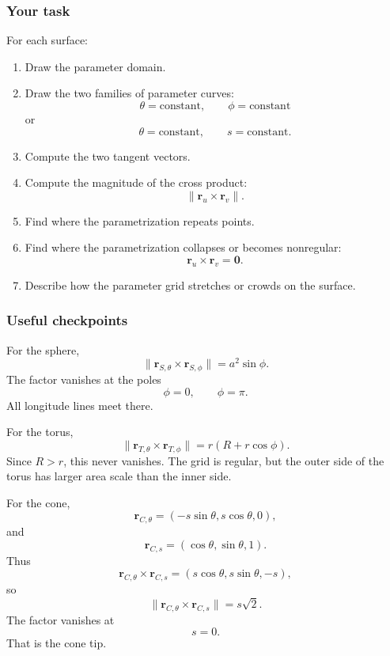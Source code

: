 \subsubsection*{Your task}

For each surface:

\begin{enumerate}
\item Draw the parameter domain.

\item Draw the two families of parameter curves:
\[
    \theta=\text{constant},
    \qquad
    \phi=\text{constant}
\]
or
\[
    \theta=\text{constant},
    \qquad
    s=\text{constant}.
\]

\item Compute the two tangent vectors.

\item Compute the magnitude of the cross product:
\[
    \|\mathbf r_u\times\mathbf r_v\|.
\]

\item Find where the parametrization repeats points.

\item Find where the parametrization collapses or becomes nonregular:
\[
    \mathbf r_u\times\mathbf r_v=\mathbf 0.
\]

\item Describe how the parameter grid stretches or crowds on the surface.
\end{enumerate}

\subsubsection*{Useful checkpoints}

For the sphere,
\[
\boxed{
    \|\mathbf r_{S,\theta}\times\mathbf r_{S,\phi}\|
    =
    a^2\sin\phi.
}
\]
The factor vanishes at the poles
\[
    \phi=0,\qquad \phi=\pi.
\]
All longitude lines meet there.

For the torus,
\[
\boxed{
    \|\mathbf r_{T,\theta}\times\mathbf r_{T,\phi}\|
    =
    r(R+r\cos\phi).
}
\]
Since \(R>r\), this never vanishes.  The grid is regular, but the outer side of the
torus has larger area scale than the inner side.

For the cone,
\[
    \mathbf r_{C,\theta}=(-s\sin\theta,s\cos\theta,0),
\]
and
\[
    \mathbf r_{C,s}=(\cos\theta,\sin\theta,1).
\]
Thus
\[
\boxed{
    \mathbf r_{C,\theta}\times\mathbf r_{C,s}
    =
    (s\cos\theta,s\sin\theta,-s),
}
\]
so
\[
\boxed{
    \|\mathbf r_{C,\theta}\times\mathbf r_{C,s}\|=s\sqrt2.
}
\]
The factor vanishes at
\[
    s=0.
\]
That is the cone tip.

